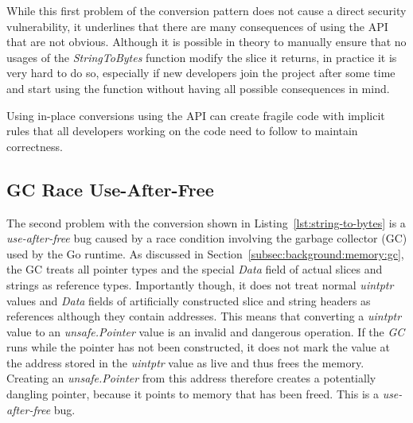 While this first problem of the conversion pattern does not cause a direct security vulnerability, it underlines that
there are many consequences of using the \unsafe{} \acrshort{API} that are not obvious.
Although it is possible in theory to manually ensure that no usages of the \textit{StringToBytes} function modify the
slice it returns, in practice it is very hard to do so, especially if new developers join the project after some time
and start using the function without having all possible consequences in mind.

\begin{insight}
    Using in-place conversions using the \unsafe{} API can create fragile code with implicit rules that all developers
    working on the code need to follow to maintain correctness.
\end{insight}



\subsection{GC Race Use-After-Free}\label{subsec:unsafe-security-problems:slice-casts:gc-race}

The second problem with the conversion shown in Listing~\ref{lst:string-to-bytes} is a \textit{use-after-free} bug
caused by a race condition involving the garbage collector (\acrshort{GC}) used by the Go runtime.
As discussed in Section~\ref{subsec:background:memory:gc}, the \acrshort{GC} treats all pointer types and the special
\textit{Data} field of actual slices and strings as reference types.
Importantly though, it does not treat normal \textit{uintptr} values and \textit{Data} fields of artificially
constructed slice and string headers as references although they contain addresses.
This means that converting a \textit{uintptr} value to an \textit{unsafe.Pointer} value is an invalid and dangerous
operation.
If the \textit{GC} runs while the pointer has not been constructed, it does not mark the value at the address
stored in the \textit{uintptr} value as live and thus frees the memory.
Creating an \textit{unsafe.Pointer} from this address therefore creates a potentially dangling pointer, because it
points to memory that has been freed.
This is a \textit{use-after-free} bug.

